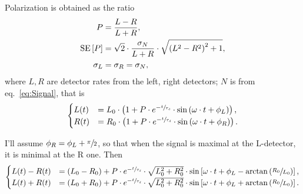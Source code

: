 \documentclass{article}
\begin{document}
Polarization is obtained as the ratio
\begin{align*}
	P	&= \frac{L-R}{L+R}, \\
	\SE{P}	&= \sqrt{2}\cdot \frac{\SD{N}}{L+R}\cdot\sqrt{\bkt{L^2-R^2}^2+1}, \\
	\SD{L} &= \SD{R} = \SD{N},
\end{align*}
where $L,R$ are detector rates from the left, right detectors; $N$ is from eq.~\eqref{eq:Signal}, that is
\newcommand{\sgl}[1]{
	{#1}_0\cdot\bkt{1 + P\cdot e^{-\sfrac{t}{\tau_d}}\cdot\sin\bkt{\omega\cdot t+\phi_{#1}}}
}
\begin{equation}
	\begin{cases}
		L(t) &= \sgl{L}, \\
		R(t) &= \sgl{R}.
	\end{cases}
\end{equation}

I'll assume $\phi_R = \phi_L + \sfrac{\pi}{2}$, so that when the signal is maximal at the L-detector, it is minimal at the R one. Then
\begin{equation}
	\begin{cases}
		L(t)-R(t)	&= (L_0-R_0) + P\cdot e^{-\sfrac{t}{\tau_d}}\cdot\sqrt{L_0^2+R_0^2}\cdot\sin\bkt*{\omega\cdot t + \phi_L - \arctan\bkt{\sfrac{R_0}{L_0}}}, \\
		L(t)+R(t)	&= (L_0+R_0) + P\cdot e^{-\sfrac{t}{\tau_d}}\cdot\sqrt{L_0^2+R_0^2}\cdot\sin\bkt*{\omega\cdot t + \phi_L + \arctan\bkt{\sfrac{R_0}{L_0}}}.
	\end{cases}
\end{equation}
\end{document}
